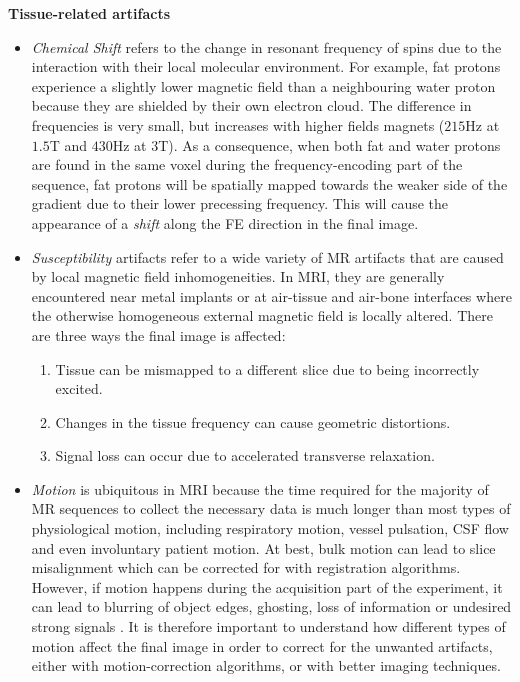 \textbf{Tissue-related artifacts}
    \begin{itemize}
        \item \textit{Chemical Shift} refers to the change in resonant frequency of spins due to the interaction with their local molecular environment.
        For example, fat protons experience a slightly lower magnetic field than a neighbouring water proton because they are shielded by their own electron cloud.
        The difference in frequencies is very small, but increases with higher fields magnets ($215$Hz at $1.5$T and $430$Hz at $3$T).
        As a consequence, when both fat and water protons are found in the same voxel during the frequency-encoding part of the sequence, fat protons will be spatially mapped towards the weaker side of the gradient due to their lower precessing frequency.
        This will cause the appearance of a \textit{shift} along the FE direction in the final image. 
        
        \item \textit{Susceptibility} artifacts refer to a wide variety of MR artifacts that are caused by local magnetic field inhomogeneities.
        In MRI, they are generally encountered near metal implants or at air-tissue and air-bone interfaces where the otherwise homogeneous external magnetic field is locally altered.
        There are three ways the final image is affected:
        \begin{enumerate}
            \item Tissue can be mismapped to a different slice due to being incorrectly excited.
            \item Changes in the tissue frequency can cause geometric distortions.
            \item Signal loss can occur due to accelerated transverse relaxation.
        \end{enumerate}
        
        \item \textit{Motion} is ubiquitous in MRI because
        the time required for the majority of MR sequences to collect the necessary data is much longer than most types of physiological motion, including respiratory motion, vessel pulsation, CSF flow and even involuntary patient motion.
        At best, bulk motion can lead to slice misalignment which can be corrected for with registration algorithms.
        However, if motion happens during the acquisition part of the experiment, it can lead to blurring of object edges, ghosting, loss of information or undesired strong signals \cite{Zaitsev2015}.
        It is therefore important to understand how different types of motion affect the final image in order to correct for the unwanted artifacts, either with motion-correction algorithms, or with better imaging techniques.
        
    \end{itemize}

